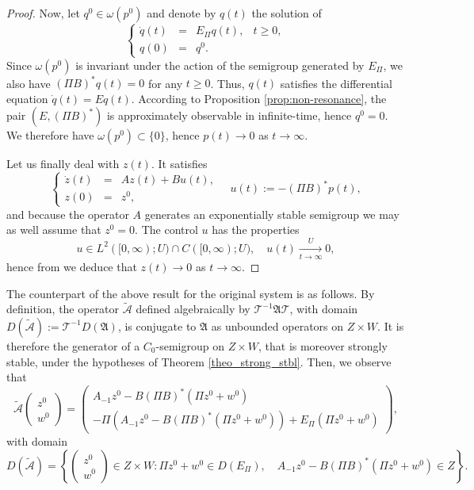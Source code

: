 \documentclass[10pt]{article}
\begin{document}
\begin{proof}
Now, let $q^0 \in \omega(p^0)$ and denote by $q(t)$ the solution of 
\[
\left\lbrace \begin{array}{rclc}
    \dot{q}(t) &=& E_\Pi q(t),& t \geq 0,  \\
    q(0) &=& q^0. 
\end{array}\right.
\]
Since $\omega(p^0)$ is invariant under the action of the semigroup generated by $E_\Pi$, we also have $(\Pi B)^*q(t) = 0$ for any $t\geqslant 0$. Thus, $q(t)$ satisfies the differential equation $\dot{q}(t) = E q(t)$. According to Proposition \ref{prop:non-resonance}, the pair $(E,(\Pi B)^*)$ is approximately observable in infinite-time, hence $q^0 = 0$. We therefore have $\omega(p^0) \subset \{ 0 \}$, hence $p(t) \rightarrow 0$ as $t \rightarrow \infty$.


Let us finally deal with $z(t)$. It satisfies 
\[
\left\lbrace \begin{array}{rcl}
    \dot{z}(t) &=& Az(t) + Bu(t),  \\
    z(0) & = & z^0, 
\end{array}\right. \quad  u(t) :=-(\Pi B)^* p(t),
\]
and because the operator $A$ generates an exponentially stable semigroup we may as well assume that $z^0 = 0$. The control $u$ has the properties 
\[
u \in L^2([0,\infty);U) \cap C([0,\infty);U),\quad u(t) \xrightarrow[t \to \infty]{U} 0,
\]
hence from \cite[Proposition 4.4.5]{tucsnak2009observation} we deduce that $z(t) \rightarrow 0$ as $t \rightarrow \infty$.
\end{proof}
The counterpart of the above result for the original system is as follows. By definition, the operator $\tilde{\mathcal{A}}$ defined algebraically by $\mathcal{T}^{-1} \mathfrak{A} \mathcal{T}$, with domain $D(\tilde{\mathcal{A}}) := \mathcal{T}^{-1} D(\mathfrak{A})$, is conjugate to $\mathfrak{A}$ as unbounded operators on $Z \times W$. It is therefore the generator of a $C_0$-semigroup on $Z \times W$, that is moreover strongly stable, under the hypotheses of Theorem \ref{theo_strong_stbl}. Then, we observe that 
\[
\tilde{\mathcal{A}} \left( \begin{array}{c}
z^0 \\ w^0 \end{array} \right) = \left( \begin{array}{cc}
    A_{-1} z^0 - B(\Pi B)^* (\Pi z^0 + w^0) \\
    -\Pi \left( A_{-1} z^0 - B(\Pi B)^* (\Pi z^0 + w^0) \right) + E_\Pi (\Pi z^0 + w^0)
\end{array}\right),
\]
with domain 
\[
D(\tilde{\mathcal{A}}) = \left\lbrace \left( \begin{array}{c}
z^0 \\ w^0 \end{array} \right) \in Z \times W : \Pi z^0 + w^0 \in D(E_\Pi),\quad A_{-1}z^0 - B(\Pi B)^*(\Pi z^0 + w^0) \in Z \right\rbrace.
\]
\end{document}
